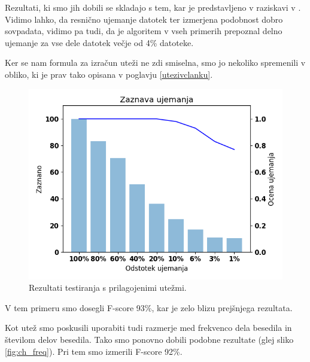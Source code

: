 \documentclass{acm_proc_article-sp}
\begin{document}
Rezultati, ki smo jih dobili se skladajo s tem, kar je predstavljeno v raziskavi v \cite{fbhash}. Vidimo lahko, da resnično ujemanje datotek ter izmerjena podobnost dobro sovpadata, vidimo pa tudi, da je algoritem v vseh primerih prepoznal delno ujemanje za vse dele datotek večje od 4\% datoteke.

Ker se nam formula za izračun uteži ne zdi smiselna, smo jo nekoliko spremenili v obliko, ki je prav tako opisana v poglavju \ref{utezivclanku}.

\begin{figure}[htb]
\begin{center}
\includegraphics[width=1\columnwidth]{ch_tfidf_weight_majhna.png}
\end{center}
\caption{\small{Rezultati testiranja s prilagojenimi utežmi.}}
\label{fig:ch_tfidf}
\end{figure}

V tem primeru smo dosegli F-score 93\%, kar je zelo blizu prejšnjega rezultata.

Kot utež smo poskusili uporabiti tudi razmerje med frekvenco dela besedila in številom delov besedila. Tako smo ponovno dobili podobne rezultate (glej sliko \ref{fig:ch_freq}). Pri tem smo izmerili F-score 92\%.
\end{document}
